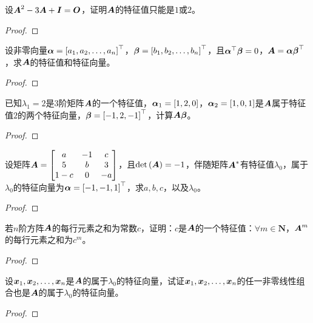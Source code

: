\begin{problem}
设\(\boldsymbol{A}^2-3\boldsymbol{A}+\boldsymbol{I}=\boldsymbol{O}\)，证明\(\boldsymbol{A}\)的特征值只能是\(1\)或\(2\)。
\end{problem}
\begin{proof}

\end{proof}

\setcounter{problem}{11}
\begin{problem}
设非零向量\(\boldsymbol{\alpha}=\left[ {a}_1,{a}_2,\dots,{a}_{n} \right]^\top\)，\(\boldsymbol{\beta}=\left[ {b}_1,{b}_2,\dots,{b}_{n} \right]^\top\)，且\(\boldsymbol{\alpha}^\top\boldsymbol{\beta}=0\)，\(\boldsymbol{A}=\boldsymbol{\alpha}\boldsymbol{\beta}^\top\)，求\(\boldsymbol{A}\)的特征值和特征向量。
\end{problem}
\begin{proof}

\end{proof}

\begin{problem}
已知\(\lambda_1=2\)是\(3\)阶矩阵\(\boldsymbol{A}\)的一个特征值，\(\boldsymbol{\alpha}_1=\left[ 1,2,0 \right]\)，\(\boldsymbol{\alpha}_2=\left[ 1,0,1 \right]\)是\(\boldsymbol{A}\)属于特征值\(2\)的两个特征向量，\(\boldsymbol{\beta}=\left[ -1,2,-1 \right]^\top\)，计算\(\boldsymbol{A}\boldsymbol{\beta}\)。
\end{problem}
\begin{proof}

\end{proof}

\begin{problem}
设矩阵\(\boldsymbol{A}=\begin{bmatrix}a&-1&c\\5&b&3\\1-c&0&-a\end{bmatrix}\)，且\(\mathrm{det}\left( \boldsymbol{A} \right)=-1\)，伴随矩阵\(\boldsymbol{A}^*\)有特征值\(\lambda_0\)，属于\(\lambda_0\)的特征向量为\(\boldsymbol{\alpha}=\left[ -1,-1,1 \right]^\top\)，求\(a,b,c\)，以及\(\lambda_0\)。
\end{problem}
\begin{proof}

\end{proof}

\begin{problem}
若\(n\)阶方阵\(\boldsymbol{A}\)的每行元素之和为常数\(c\)，证明：\(c\)是\(\boldsymbol{A}\)的一个特征值：\(\forall m\in\mathbf{N}\)，\(\boldsymbol{A}^m\)的每行元素之和为\(c^m\)。
\end{problem}
\begin{proof}

\end{proof}

\setcounter{problem}{17}
\begin{problem}
设\({\boldsymbol{x}}_1,{\boldsymbol{x}}_2,\dots,{\boldsymbol{x}}_{n}\)是\(\boldsymbol{A}\)的属于\(\lambda_0\)的特征向量，试证\({\boldsymbol{x}}_1,{\boldsymbol{x}}_2,\dots,{\boldsymbol{x}}_{n}\)的任一非零线性组合也是\(\boldsymbol{A}\)的属于\(\lambda_0\)的特征向量。
\end{problem}
\begin{proof}

\end{proof}


